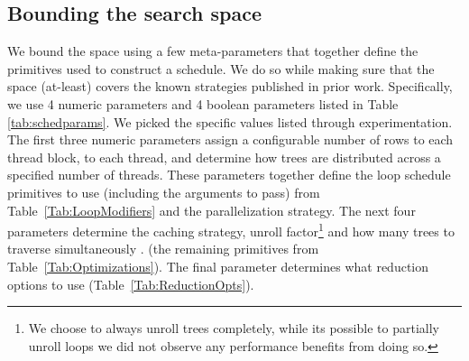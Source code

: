 \subsection{Bounding the search space}
We bound the space using a few meta-parameters that together define 
the primitives used to construct a schedule. We do so while making sure 
that the space (at-least) covers the known strategies published in prior work.
Specifically, we use 4 numeric parameters and 4 boolean parameters listed in Table \ref{tab:schedparams}.
We picked the specific values listed through experimentation.
The first three numeric parameters assign a configurable number of rows to each 
thread block, to each thread, and determine how trees are distributed across a
specified number of threads. These parameters together define the loop schedule 
primitives to use (including the arguments to pass) from Table~\ref{Tab:LoopModifiers} 
and the parallelization strategy. The next four parameters determine the caching strategy, 
unroll factor{\footnote{We choose to always unroll trees completely, while its possible 
to partially unroll loops we did not observe any performance benefits from doing so.}} 
and how many trees to traverse simultaneously .  (the remaining primitives from Table~\ref{Tab:Optimizations}).  
The final parameter determines what reduction options to use (Table~\ref{Tab:ReductionOpts}).

